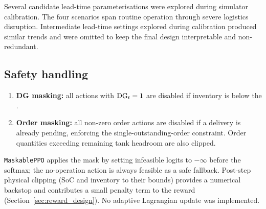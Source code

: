 Several candidate lead-time parameterisations were explored during
simulator calibration. The four scenarios span routine operation through
severe logistics disruption. Intermediate lead-time settings explored
during calibration produced similar trends and were omitted to keep the
final design interpretable and non-redundant.

\subsection{Safety handling}


\begin{enumerate}
  \item \textbf{DG masking:} all actions with $\mathrm{DG}_t = 1$ are disabled if
inventory is below the .
  \item \textbf{Order masking:} all non-zero order actions are disabled if
  a delivery is already pending, enforcing the single-outstanding-order
  constraint. Order quantities exceeding remaining tank headroom are also
  clipped.
\end{enumerate}

\texttt{MaskablePPO} applies the mask by setting infeasible logits to
$-\infty$ before the softmax; the no-operation action is always feasible
as a safe fallback. Post-step physical clipping (SoC and inventory to
their bounds) provides a numerical backstop and contributes a small
penalty term to the reward (Section~\ref{sec:reward_design}). No adaptive Lagrangian update was implemented.



